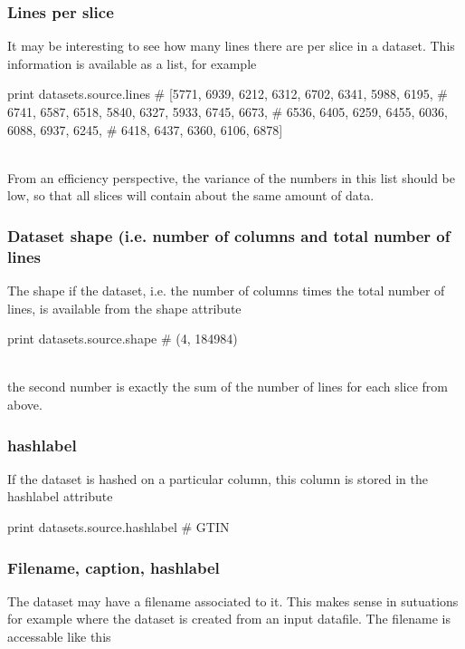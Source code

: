 \subsubsection{Lines per slice}

It may be interesting to see how many lines there are per slice in a
dataset.  This information is available as a list, for example

\begin{python}
print datasets.source.lines
# [5771, 6939, 6212, 6312, 6702, 6341, 5988, 6195,
#  6741, 6587, 6518, 5840, 6327, 5933, 6745, 6673,
#  6536, 6405, 6259, 6455, 6036, 6088, 6937, 6245,
#  6418, 6437, 6360, 6106, 6878]
\end{python}
\\
From an efficiency perspective, the variance of the numbers in this
list should be low, so that all slices will contain about the same
amount of data.

\subsubsection{Dataset shape (i.e. number of columns and total number
  of lines}

The shape if the dataset, i.e. the number of columns times the total
number of lines, is available from the shape attribute

\begin{python}
print datasets.source.shape
# (4, 184984)
\end{python}
\\
the second number is exactly the sum of the number of lines for each
slice from above.



\subsubsection{hashlabel}
If the dataset is hashed on a particular column, this column is stored
in the hashlabel attribute

\begin{python}
print datasets.source.hashlabel
# GTIN
\end{python}



\subsubsection{Filename, caption, hashlabel}

The dataset may have a filename associated to it.  This makes sense in
sutuations for example where the dataset is created from an input
datafile.  The filename is accessable like this

